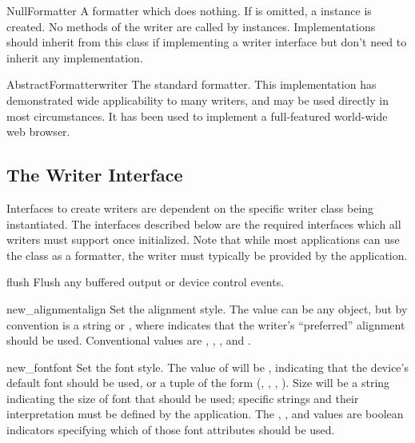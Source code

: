 
\begin{funcdesc}{NullFormatter}{}
A formatter which does nothing.  If  is omitted, a
 instance is created.  No methods of the writer are
called by  instances.  Implementations should inherit
from this class if implementing a writer interface but don't need to
inherit any implementation.
\end{funcdesc}

\begin{funcdesc}{AbstractFormatter}{writer}
The standard formatter.  This implementation has demonstrated wide
applicability to many writers, and may be used directly in most
circumstances.  It has been used to implement a full-featured
world-wide web browser.
\end{funcdesc}



\subsection{The Writer Interface}

Interfaces to create writers are dependent on the specific writer
class being instantiated.  The interfaces described below are the
required interfaces which all writers must support once initialized.
Note that while most applications can use the 
class as a formatter, the writer must typically be provided by the
application.


\begin{funcdesc}{flush}{}
Flush any buffered output or device control events.
\end{funcdesc}

\begin{funcdesc}{new_alignment}{align}
Set the alignment style.  The  value can be any object,
but by convention is a string or , where 
indicates that the writer's ``preferred'' alignment should be used.
Conventional  values are , ,
, and .
\end{funcdesc}

\begin{funcdesc}{new_font}{font}
Set the font style.  The value of  will be ,
indicating that the device's default font should be used, or a tuple
of the form (, , , ).
Size will be a string indicating the size of font that should be used;
specific strings and their interpretation must be defined by the
application.  The , , and  values
are boolean indicators specifying which of those font attributes
should be used.
\end{funcdesc}

